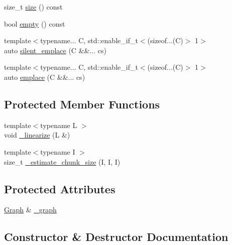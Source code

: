 \begin{DoxyCompactItemize}
\item 
size\+\_\+t \hyperlink{classtf_1_1FlowBuilder_ab0f3d86726d6e803dedeb2811bf811c3}{size} () const
\item 
bool \hyperlink{classtf_1_1FlowBuilder_a18909c48304f1827884708dc943efb6a}{empty} () const
\item 
{\footnotesize template$<$typename... C, std\+::enable\+\_\+if\+\_\+t$<$(sizeof...(\+C)$>$ 1$>$ }\\auto \hyperlink{classtf_1_1FlowBuilder_abe0b13ab3bb54903c6ea6856101aae5b}{silent\+\_\+emplace} (C \&\&... cs)
\item 
{\footnotesize template$<$typename... C, std\+::enable\+\_\+if\+\_\+t$<$(sizeof...(\+C)$>$ 1$>$ }\\auto \hyperlink{classtf_1_1FlowBuilder_aaf1c2bad2e5f31225584db88019a952a}{emplace} (C \&\&... cs)
\end{DoxyCompactItemize}
\subsection*{Protected Member Functions}
\begin{DoxyCompactItemize}
\item 
{\footnotesize template$<$typename L $>$ }\\void \hyperlink{classtf_1_1FlowBuilder_a04115519f61efc42d018ea697054135d}{\+\_\+linearize} (L \&)
\item 
{\footnotesize template$<$typename I $>$ }\\size\+\_\+t \hyperlink{classtf_1_1FlowBuilder_ab98b07f1f11153628d1e1222058e9b55}{\+\_\+estimate\+\_\+chunk\+\_\+size} (I, I, I)
\end{DoxyCompactItemize}
\subsection*{Protected Attributes}
\begin{DoxyCompactItemize}
\item 
\hyperlink{namespacetf_a2afa7da139285640eaf8122535136dc9}{Graph} \& \hyperlink{classtf_1_1FlowBuilder_a9404a57d9d37a4d49d20b686e4e5f68f}{\+\_\+graph}
\end{DoxyCompactItemize}


\subsection{Constructor \& Destructor Documentation}
\mbox{\label{classtf_1_1FlowBuilder_ab9fcccd3c62467052a263b2fd2ca406b}} 
